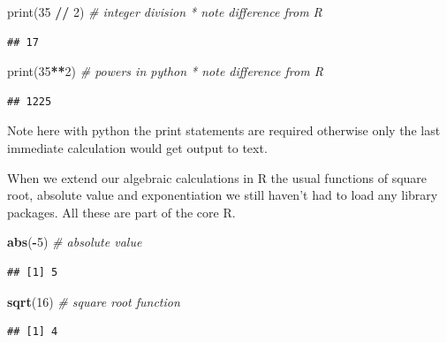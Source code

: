 \documentclass[]{book}
\newenvironment{Shaded}{\begin{snugshade}}{\end{snugshade}}
\newcommand{\KeywordTok}[1]{\textcolor[rgb]{0.13,0.29,0.53}{\textbf{#1}}}
\newcommand{\DecValTok}[1]{\textcolor[rgb]{0.00,0.00,0.81}{#1}}
\newcommand{\CommentTok}[1]{\textcolor[rgb]{0.56,0.35,0.01}{\textit{#1}}}
\newcommand{\OperatorTok}[1]{\textcolor[rgb]{0.81,0.36,0.00}{\textbf{#1}}}
\newcommand{\BuiltInTok}[1]{#1}
\newcommand{\NormalTok}[1]{#1}
\theoremstyle{definition}
\theoremstyle{definition}
\theoremstyle{definition}
\theoremstyle{remark}
\begin{document}
\begin{Shaded}
\begin{Highlighting}[]
\BuiltInTok{print}\NormalTok{(}\DecValTok{35} \OperatorTok{//} \DecValTok{2}\NormalTok{)    }\CommentTok{# integer division       * note difference from R}
\end{Highlighting}
\end{Shaded}

\begin{verbatim}
## 17
\end{verbatim}

\begin{Shaded}
\begin{Highlighting}[]
\BuiltInTok{print}\NormalTok{(}\DecValTok{35}\OperatorTok{**}\DecValTok{2}\NormalTok{)      }\CommentTok{# powers in python     * note difference from R}
\end{Highlighting}
\end{Shaded}

\begin{verbatim}
## 1225
\end{verbatim}

Note here with python the print statements are required otherwise only
the last immediate calculation would get output to text.

When we extend our algebraic calculations in R the usual functions of
square root, absolute value and exponentiation we still haven't had to
load any library packages. All these are part of the core R.

\begin{Shaded}
\begin{Highlighting}[]
\KeywordTok{abs}\NormalTok{(}\OperatorTok{-}\DecValTok{5}\NormalTok{)          }\CommentTok{# absolute value}
\end{Highlighting}
\end{Shaded}

\begin{verbatim}
## [1] 5
\end{verbatim}

\begin{Shaded}
\begin{Highlighting}[]
\KeywordTok{sqrt}\NormalTok{(}\DecValTok{16}\NormalTok{)         }\CommentTok{# square root function}
\end{Highlighting}
\end{Shaded}

\begin{verbatim}
## [1] 4
\end{verbatim}
\end{document}
